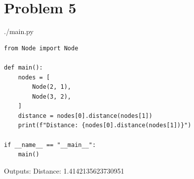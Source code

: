 \documentclass{article}
\begin{document}
    \section*{Problem 5}
        \begin{minipage}{\linewidth}
            \raggedright
            ./main.py
            \begin{lstlisting}
from Node import Node

def main():
    nodes = [
        Node(2, 1),
        Node(3, 2),
    ]
    distance = nodes[0].distance(nodes[1])  
    print(f"Distance: {nodes[0].distance(nodes[1])}")
    
if __name__ == "__main__":
    main()
            \end{lstlisting}
            Outputs: \break
            Distance: 1.4142135623730951
        \end{minipage}

\end{document}
